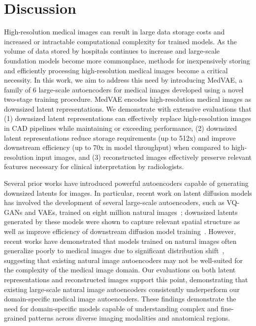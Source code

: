 \section{Discussion}

High-resolution medical images can result in large data storage costs and increased or intractable computational complexity for trained models. As the volume of data stored by hospitals continues to increase and large-scale foundation models become more commonplace, methods for inexpensively storing and efficiently processing high-resolution medical images become a critical necessity. In this work, we aim to address this need by introducing MedVAE, a family of 6 large-scale autoencoders for medical images developed using a novel two-stage training procedure. MedVAE encodes high-resolution medical images as downsized latent representations. We demonstrate with extensive evaluations that (1) downsized latent representations can effectively replace high-resolution images in CAD pipelines while maintaining or exceeding performance, (2) downsized latent representations reduce storage requirements (up to 512x) and improve downstream efficiency (up to 70x in model throughput) when compared to high-resolution input images, and (3) reconstructed images effectively preserve relevant features necessary for clinical interpretation by radiologists.

Several prior works have introduced powerful autoencoders capable of generating downsized latents for images. In particular, recent work on latent diffusion models has involved the development of several large-scale autoencoders, such as VQ-GANs and VAEs, trained on eight million natural images~\cite{rombach2022high,kingma2013vae,esser2021taming,openimages}; downsized latents generated by these models were shown to capture relevant spatial structure as well as improve efficiency of downstream diffusion model training~\cite{rombach2022high}. However, recent works have demonstrated that models trained on natural images often generalize poorly to medical images due to significant distribution shift~\cite{guan2022,van2023exploring,chambon2022adapting}, suggesting that existing natural image autoencoders may not be well-suited for the complexity of the medical image domain. Our evaluations on both latent representations and reconstructed images support this point, demonstrating that existing large-scale natural image autoencoders consistently underperform our domain-specific medical image autoencoders. These findings demonstrate the need for domain-specific models capable of understanding complex and fine-grained patterns across diverse imaging modalities and anatomical regions.

